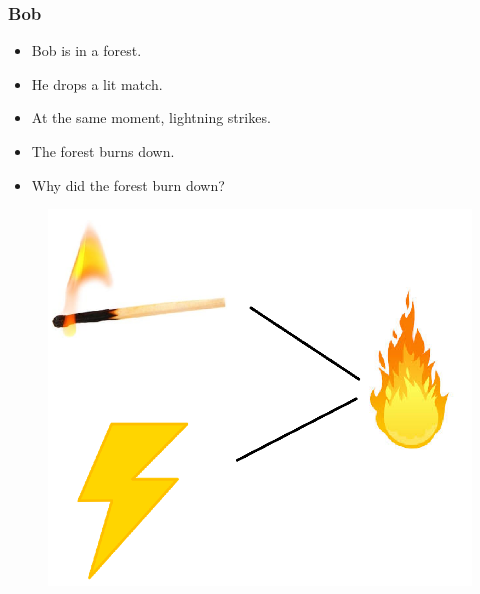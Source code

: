 \documentclass{beamer}
\theoremstyle{plain}
\theoremstyle{definition}
\begin{document}
\begin{frame}
\frametitle{Bob}
\begin{itemize}
\item Bob is in a forest.
\item He drops a lit match.
\item At the same moment, lightning strikes.
\item The forest burns down.
\item Why did the forest burn down?
\end{itemize}

\begin{figure}
\includegraphics[scale=0.25]{bobLightningFire}
\end{figure}
\end{frame}
\end{document}
